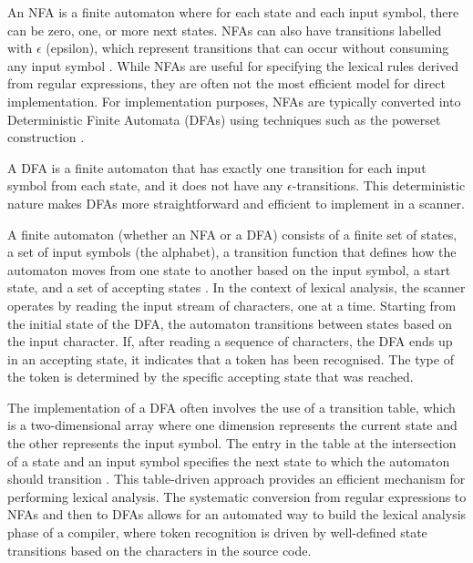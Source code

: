 An NFA is a finite automaton where for each state and each input symbol, there can be zero, one, or more next states. NFAs can also have transitions labelled with $\epsilon$ (epsilon), which represent transitions that can occur without consuming any input symbol \cite{aho2007compilers}. While NFAs are useful for specifying the lexical rules derived from regular expressions, they are often not the most efficient model for direct implementation. For implementation purposes, NFAs are typically converted into Deterministic Finite Automata (DFAs) using techniques such as the powerset construction \cite{aho2007compilers}. 

A DFA is a finite automaton that has exactly one transition for each input symbol from each state, and it does not have any $\epsilon$-transitions. This deterministic nature makes DFAs more straightforward and efficient to implement in a scanner.


A finite automaton (whether an NFA or a DFA) consists of a finite set of states, a set of input symbols (the alphabet), a transition function that defines how the automaton moves from one state to another based on the input symbol, a start state, and a set of accepting states \cite{aho2007compilers}. 
In the context of lexical analysis, the scanner operates by reading the input stream of characters, one at a time. Starting from the initial state of the DFA, the automaton transitions between states based on the input character. If, after reading a sequence of characters, the DFA ends up in an accepting state, it indicates that a token has been recognised. The type of the token is determined by the specific accepting state that was reached. 

The implementation of a DFA often involves the use of a transition table, which is a two-dimensional array where one dimension represents the current state and the other represents the input symbol. The entry in the table at the intersection of a state and an input symbol specifies the next state to which the automaton should transition \cite{aho2007compilers}. This table-driven approach provides an efficient mechanism for performing lexical analysis. The systematic conversion from regular expressions to NFAs and then to DFAs allows for an automated way to build the lexical analysis phase of a compiler, where token recognition is driven by well-defined state transitions based on the characters in the source code.


